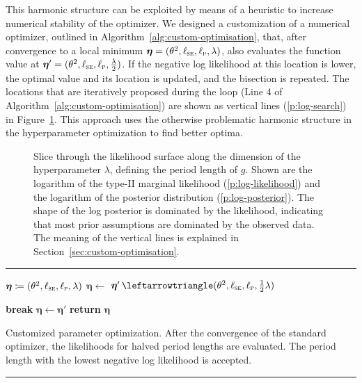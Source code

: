 This harmonic structure can be exploited by means of a heuristic to increase
numerical stability of the optimizer. We designed a customization of a
numerical optimizer, outlined in Algorithm~\ref{alg:custom-optimisation}, that,
after convergence to a local minimum
$\boldsymbol{\eta}=(\theta^2,\ell_{\normalfont\textsc{se}},\ell_{\normalfont\textsc{p}},\lambda)$, also
evaluates the
function value at
$\boldsymbol{\eta}'=(\theta^2,\ell_{\normalfont\textsc{se}},\ell_{\normalfont\textsc{p}},\frac{\lambda}{2}
)$. If the
negative log likelihood at this location is lower, the optimal value and its
location is updated, and the bisection is repeated. The locations that are
iteratively proposed during the loop (Line 4 of
Algorithm~\ref{alg:custom-optimisation}) are shown as
vertical lines (\ref*{p:log-search}) in Figure~\ref{fig:maximum_likelihood}.
This approach uses the otherwise problematic harmonic structure in the
hyperparameter optimization to find better optima.

\begin{figure}%
\centering%
\footnotesize%
%
\caption[Slice through the likelihood surface.]{Slice through the
likelihood surface along the dimension of the hyperparameter $\lambda$, defining
the period length of $g$. Shown are the logarithm of the type-II marginal
likelihood (\ref*{p:log-likelihood}) and the logarithm of the posterior
distribution (\ref*{p:log-posterior}). The shape of the log posterior is
dominated by the likelihood, indicating that most prior assumptions are
dominated by the observed data. The meaning of the vertical lines is explained
in Section~\ref{sec:custom-optimisation}.}
  \label{fig:maximum_likelihood}
\end{figure}

\vspace{1.1cm}
\begin{algorithm}
\vspace{-1.1cm}
\hrule
\vspace{2mm}
\begin{algorithmic}[1]%
\State $\boldsymbol{\eta} \coloneqq
(\theta^2,\ell_{\normalfont\textsc{se}},\ell_{\normalfont\textsc{p}},\lambda)$
  \State $\boldsymbol{\eta} \gets$
 
    \Loop
      \State $\boldsymbol{\eta}' \gets
(\theta^2,\ell_\mathsc{se},\ell_\mathsc{p},\frac{1}{2}\lambda)$ 

        \State \textbf{break} 
      \Else
        \State $\boldsymbol{\eta} \gets \boldsymbol{\eta}'$
      \EndIf
    \EndLoop
    \State \textbf{return} $\boldsymbol{\eta}$
\end{algorithmic}%
\caption[Customized parameter optimization.]{Customized parameter
optimization. After the convergence of the standard optimizer, the
likelihoods for halved period lengths are evaluated. The period length with the
lowest negative log likelihood is accepted.}%
\label{alg:custom-optimisation}%
\vspace{1mm}
\hrule
\end{algorithm}

